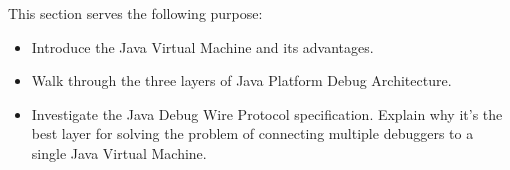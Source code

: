 \documentclass[..thesis.tex]{subfiles}
\begin{document}
This section serves the following purpose:

\begin{itemize}
  \item 
    Introduce the Java Virtual Machine and its advantages.
  \item 
    Walk through the three layers of Java Platform Debug Architecture.
  \item 
    Investigate the Java Debug Wire Protocol specification. 
    Explain why it's the best layer for solving the problem of connecting multiple debuggers to a single Java Virtual Machine.
\end{itemize}
\end{document}
